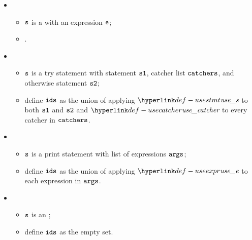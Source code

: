 \begin{itemize}
  \item {}
  \begin{itemize}
    \item $\vs$ is a \throwstatementsterm{} with an \optional{} expression $\ve$;
    \item {}.
  \end{itemize}

  \item {}
  \begin{itemize}
    \item $\vs$ is a try statement with statement $\vsone$, catcher list $\catchers$, and otherwise statement $\vstwo$;
    \item define $\ids$ as the union of applying $\usestmt$ to both $\vsone$ and $\vstwo$ and $\usecatcher$ to
          every catcher in $\catchers$.
  \end{itemize}

  \item {}
  \begin{itemize}
    \item $\vs$ is a print statement with list of expressions $\vargs$;
    \item define $\ids$ as the union of applying $\useexpr$ to each expression in $\vargs$.
  \end{itemize}

  \item {}
  \begin{itemize}
    \item $\vs$ is an \unreachablestatementterm{};
    \item define $\ids$ as the empty set.
  \end{itemize}
\end{itemize}

\FormallyParagraph
\begin{mathpar}
\end{mathpar}


